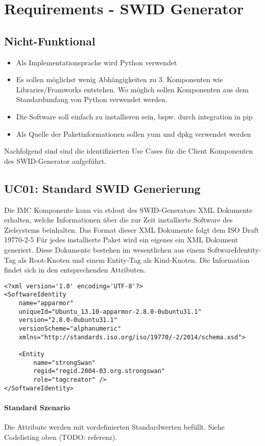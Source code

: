 \section{Requirements - SWID Generator}
\subsection{Nicht-Funktional}
\begin{itemize}
    \item Als Implementationsprache wird Python verwendet
    \item Es sollen möglichst wenig Abhängigkeiten zu 3. Komponenten wie Libraries/Framworks entstehen. Wo möglich sollen Komponenten aus dem Standardumfang von Python verwendet werden.
    \item Die Software soll einfach zu installieren sein, bspw. durch integration in pip
    \item Als Quelle der Paketinformationen sollen yum und dpkg verwendet werden
\end{itemize}
Nachfolgend sind sind die identifizierten Use Cases für die Client Komponenten des SWID-Generator aufgeführt.

\subsection*{UC01: Standard SWID Generierung}
Die IMC Komponente kann via stdout des SWID-Generators XML Dokumente erhalten, welche Informationen über die zur Zeit installierte Software des Zielsystems beinhalten.
Das Format dieser XML Dokumente folgt dem ISO Draft 19770-2-5
Für jedes installierte Paket wird ein eigenes ein XML Dokument generiert.
Diese Dokumente bestehen im wesentlichen aus einem SoftwareIdentity-Tag als Root-Knoten und einem Entity-Tag als Kind-Knoten. Die Information findet sich in den entsprechenden Attributen.
\begin{verbatim}
<?xml version='1.0' encoding='UTF-8'?>
<SoftwareIdentity 
    name="apparmor" 
    uniqueId="Ubuntu_13.10-apparmor-2.8.0-0ubuntu31.1" 
    version="2.8.0-0ubuntu31.1" 
    versionScheme="alphanumeric" 
    xmlns="http://standards.iso.org/iso/19770/-2/2014/schema.xsd">
    
    <Entity 
        name="strongSwan" 
        regid="regid.2004-03.org.strongswan" 
        role="tagcreator" />
</SoftwareIdentity>
\end{verbatim}

\paragraph{Standard Szenario}
Die Attribute werden mit vordefinierten Standardwerten befüllt. Siehe Codelisting oben (TODO: referenz).

